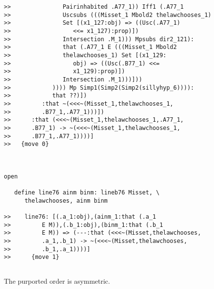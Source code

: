 \documentclass[12pt]{article}
\begin{document}
\begin{verbatim}
>>               Pairinhabited .A77_1)) Iff1 (.A77_1
>>               Uscsubs (((Misset_1 Mbold2 thelawchooses_1)
>>               Set [(x1_127:obj) => ((Usc(.A77_1)
>>                  <<= x1_127):prop)])
>>               Intersection .M_1))) Mpsubs dir2_121):
>>               that (.A77_1 E (((Misset_1 Mbold2
>>               thelawchooses_1) Set [(x1_129:
>>                  obj) => ((Usc(.B77_1) <<=
>>                  x1_129):prop)])
>>               Intersection .M_1)))]))
>>            )))) Mp Simp1(Simp2(Simp2(sillyhyp_6)))):
>>            that ??)])
>>         :that ~(<<<~(Misset_1,thelawchooses_1,
>>         .B77_1,.A77_1)))])
>>      :that (<<<~(Misset_1,thelawchooses_1,.A77_1,
>>      .B77_1) -> ~(<<<~(Misset_1,thelawchooses_1,
>>      .B77_1,.A77_1))))]
>>   {move 0}



open

   define line76 ainm binm: lineb76 Misset, \
      thelawchooses, ainm binm

>>    line76: [(.a_1:obj),(ainm_1:that (.a_1
>>         E M)),(.b_1:obj),(binm_1:that (.b_1
>>         E M)) => (---:that (<<<~(Misset,thelawchooses,
>>         .a_1,.b_1) -> ~(<<<~(Misset,thelawchooses,
>>         .b_1,.a_1))))]
>>      {move 1}


\end{verbatim}

The purported order is asymmetric.
\end{document}
